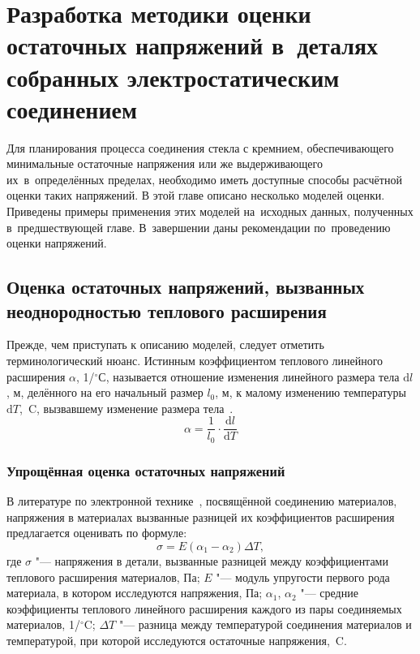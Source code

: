 \chapter{Разработка методики оценки остаточных напряжений в~деталях собранных электростатическим соединением}

Для планирования процесса соединения стекла с кремнием,
обеспечивающего минимальные остаточные напряжения или же
выдерживающего их~в~определённых пределах, необходимо иметь доступные
способы расчётной оценки таких напряжений. В этой главе описано
несколько моделей оценки. Приведены примеры применения этих моделей
на~исходных данных, полученных в~предшествующей главе. В~завершении даны
рекомендации по~проведению оценки напряжений.

\section{Оценка остаточных напряжений, вызванных неоднородностью теплового расширения}
Прежде, чем приступать к описанию моделей, следует отметить терминологический нюанс. Истинным коэффициентом теплового линейного расширения  $\alpha $, 1/${}^\circ$С, называется отношение изменения линейного размера тела  $\mathrm{d}l$, м, делённого на его начальный размер  $l_0$, м, к малому изменению температуры  $\mathrm{d}T$,~{\textdegree}C, вызвавшему изменение размера тела~\cites[6]{Mazurin1969_Tepl_rassh_stekla}.
\begin{equation*}
    \alpha =\frac 1{l_0} \cdot \frac{\mathrm{d}l}{\mathrm{d}T}
\end{equation*}

\subsection{Упрощённая оценка остаточных напряжений}
В литературе по электронной технике~\cite{zemen2010impact}, посвящённой соединению материалов,
напряжения в материалах вызванные разницей их коэффициентов расширения предлагается оценивать по
формуле:
\[
\sigma =E\left(\alpha_1-\alpha_2\right)\Delta T,
\]
где $\sigma$ "--- напряжения в детали, вызванные разницей между коэффициентами теплового расширения материалов, Па;
$E$ "--- модуль упругости первого рода материала, в котором исследуются напряжения, Па;
$\alpha_1$, $\alpha_2$ "--- средние коэффициенты теплового линейного расширения каждого из пары соединяемых материалов, 1/${}^\circ$C;
$\Delta T$ "--- разница между температурой соединения материалов и температурой, при которой исследуются остаточные напряжения,~{\textdegree}C.

